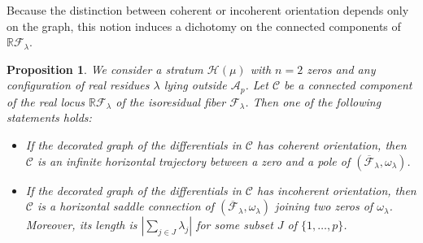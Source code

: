 \documentclass[JEP,XML,SOM,Unicode,NoFloatCountersInSection,published]{cedram}
\newtheorem{prop}[thm]{Proposition}
\theoremstyle{definition}
\begin{document}
Because the distinction between coherent or incoherent orientation depends only on the graph, this notion induces a dichotomy on the connected components of $\mathbb{R}\mathcal{F}_{\lambda}$.

\begin{prop}\label{prop:REALlocus}
We consider a stratum $\mathcal{H}(\mu)$ with $n=2$ zeros and any configuration of real residues $\lambda$ lying outside $\mathcal{A}_{p}$. Let $\mathcal{C}$ be a connected component of the real locus $\mathbb{R}\mathcal{F}_{\lambda}$ of the isoresidual fiber $\mathcal{F}_{\lambda}$. Then one of the following statements holds:
\begin{itemize}
\item If the decorated graph of the differentials in $\mathcal{C}$ has coherent orientation, then $\mathcal{C}$ is an infinite horizontal trajectory between a zero and a pole of $(\overline{\mathcal{F}}_{\lambda},\omega_{\lambda})$.
\item If the decorated graph of the differentials in $\mathcal{C}$ has incoherent orientation, then $\mathcal{C}$ is a horizontal saddle connection of $(\overline{\mathcal{F}}_{\lambda},\omega_{\lambda})$ joining two zeros of $\omega_{\lambda}$. Moreover, its length is $|\sum_{j \in J} \lambda_{j}|$ for some subset $J$ of $\lbrace{ 1,\dots,p \rbrace}$.
\end{itemize}
\end{prop}
\end{document}
